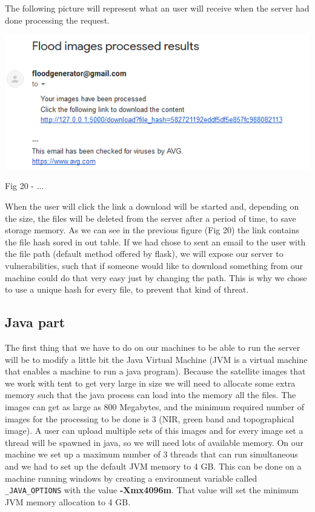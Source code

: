 \documentclass[12pt, a4paper]{report}
\begin{document}
The following picture will represent what an user will receive when the server had done processing the request.

\medskip
\includegraphics[scale=1, center]{receive_email.png}
\begin{center}
Fig 20 - ... 
\end{center}
\par 

When the user will click the link a download will be started and, depending on the size, the files will be deleted from the server after a period of time, to save storage memory. As we can see in the previous figure (Fig 20) the link contains the file hash sored in out table. If we had chose to sent an email to the user with the file path (default method offered by flask), we will expose our server to vulnerabilities, such that if someone would like to download something from our machine could do that very easy just by changing the path. This is why we chose to use a unique hash for every file, to prevent that kind of threat.

\subsection{Java part}

\quad 
The first thing that we have to do on our machines to be able to run the server will be to modify a little bit the Java Virtual Machine (JVM is a virtual machine that enables a machine to run a java program). Because the satellite images that we work with tent to get very large in size we will need to allocate some extra memory such that the java process can load into the memory all the files. The images can get as large as 800 Megabytes, and the minimum required number of images for the processing to be done is 3 (NIR, green band and topographical image). A user can upload multiple sets of this images and for every image set a thread will be spawned in java, so we will need lots of available memory. On our machine we set up a maximum number of 3 threads that can run simultaneous and we had to set up the default JVM memory to 4 GB. This can be done on a machine running windows by  creating a environment variable called \texttt{\_JAVA\_OPTIONS} with the value \textbf{-Xmx4096m}. That value will set the minimum JVM memory allocation to 4 GB.
\end{document}
